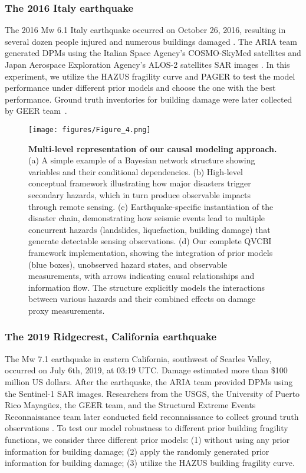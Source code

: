 \documentclass[review]{elsarticle}
\begin{document}
\subsubsection{The 2016 Italy earthquake} The 2016 Mw 6.1 Italy earthquake occurred on October 26, 2016, resulting in several dozen people injured and numerous buildings damaged \cite{Italy_impact}. The ARIA team generated DPMs using the Italian Space Agency’s COSMO-SkyMed satellites and Japan Aerospace Exploration Agency’s ALOS-2 satellites SAR images \cite{Italy_ARIA}. In this experiment, we utilize the HAZUS fragility curve and PAGER to test the model performance under different prior models and choose the one with the best performance. Ground truth inventories for building damage were later collected by GEER team~\cite{HaitiBDGT,HaitiGEER}.


\begin{figure}[h]
\centering
\texttt{[image: figures/Figure\_4.png]}
\caption{\textbf{Multi-level representation of our causal modeling approach.} (a) A simple example of a Bayesian network structure showing variables and their conditional dependencies. (b) High-level conceptual framework illustrating how major disasters trigger secondary hazards, which in turn produce observable impacts through remote sensing. (c) Earthquake-specific instantiation of the disaster chain, demonstrating how seismic events lead to multiple concurrent hazards (landslides, liquefaction, building damage) that generate detectable sensing observations. (d) Our complete QVCBI framework implementation, showing the integration of prior models (blue boxes), unobserved hazard states, and observable measurements, with arrows indicating causal relationships and information flow. The structure explicitly models the interactions between various hazards and their combined effects on damage proxy measurements.}
\label{BN_all}
\end{figure}




\subsubsection{The 2019 Ridgecrest, California earthquake} The Mw 7.1 earthquake in eastern California, southwest of Searles Valley, occurred on July 6th, 2019, at 03:19 UTC. Damage estimated more than \$100 million US dollars\cite{RC_summary}. After the earthquake, the ARIA team provided DPMs using the Sentinel-1 SAR images. Researchers from the USGS, the University of Puerto Rico Mayagüez, the GEER team, and the Structural Extreme Events Reconnaissance team later conducted field reconnaissance to collect ground truth observations \cite{allstadt2022ground,miranda2020,miranda2020b}. To test our model robustness to different prior building fragility functions, we consider three different prior models: (1) without using any prior information for building damage; (2) apply the randomly generated prior information for building damage; (3) utilize the HAZUS building fragility curve.
\end{document}
